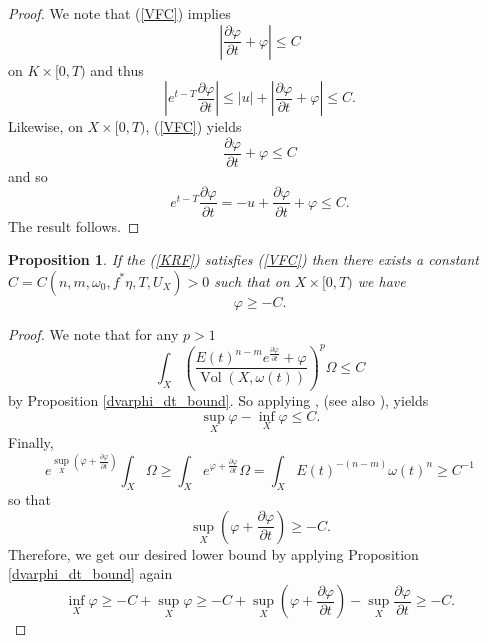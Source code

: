 \documentclass[12pt]{article}
\newtheorem{proposition}[theorem]{Proposition}
\numberwithin{equation}{section}
\renewcommand{\d}{\partial}
\DeclareMathOperator{\Vol}{Vol}
\begin{document}
\begin{proof}
We note that (\ref{VFC}) implies
\begin{equation*}
    \left|\frac{\d \varphi}{\d t} + \varphi\right| \leq C
\end{equation*}
on $K \times [0,T)$ and thus
\begin{equation*}
    \left|e^{t-T}\frac{\d \varphi}{\d t}\right| \leq |u| + \left|\frac{\d \varphi}{\d t} + \varphi\right| \leq C.
\end{equation*}
Likewise, on $X \times [0,T)$, (\ref{VFC}) yields
\begin{equation*}
    \frac{\d \varphi}{\d t} + \varphi \leq C
\end{equation*}
and so
\begin{equation*}
    e^{t-T} \frac{\d \varphi}{\d t} = -u + \frac{\d \varphi}{\d t} + \varphi \leq C.
\end{equation*}
The result follows.
\end{proof}

\begin{proposition}
If the (\ref{KRF}) satisfies (\ref{VFC}) then there exists a constant $C = C(n,m,\omega_0,f^*\eta, T, U_X) > 0$ such that on $X \times [0,T)$ we have
\begin{equation*}
    \varphi \geq -C.
\end{equation*}
\end{proposition}

\begin{proof}
We note that for any $p > 1$
\begin{equation*}
    \int_{X} \left(\frac{E(t)^{n-m} e^{\frac{\d \varphi}{\d t}}+\varphi}{\Vol(X,\omega(t))}\right)^{p} \Omega \leq C
\end{equation*}
by Proposition \ref{dvarphi_dt_bound}. So applying \cite[Thm 2.5]{ST12}, (see also \cite{DP10, EGZ08}), yields
\begin{equation*}
    \sup_X \varphi - \inf_X \varphi \leq C.
\end{equation*}
Finally, 
\begin{equation*}
    e^{\sup_{X}(\varphi + \frac{\d \varphi}{\d t})} \int_X \Omega \geq \int_X e^{\varphi + \frac{\d \varphi}{\d t}} \Omega = \int_X E(t)^{-(n-m)} \omega(t)^n \geq C^{-1}
\end{equation*}
so that
\begin{equation*}
    \sup_{X} \left(\varphi + \frac{\d \varphi}{\d t}\right) \geq -C.
\end{equation*}
Therefore, we get our desired lower bound by applying Proposition \ref{dvarphi_dt_bound} again
\begin{equation*}
    \inf_X \varphi \geq -C + \sup_X \varphi \geq -C + \sup_X \left(\varphi + \frac{\d \varphi}{\d t}\right) - \sup_X \frac{\d \varphi}{\d t} \geq -C.
\end{equation*}
\end{proof}
\end{document}

